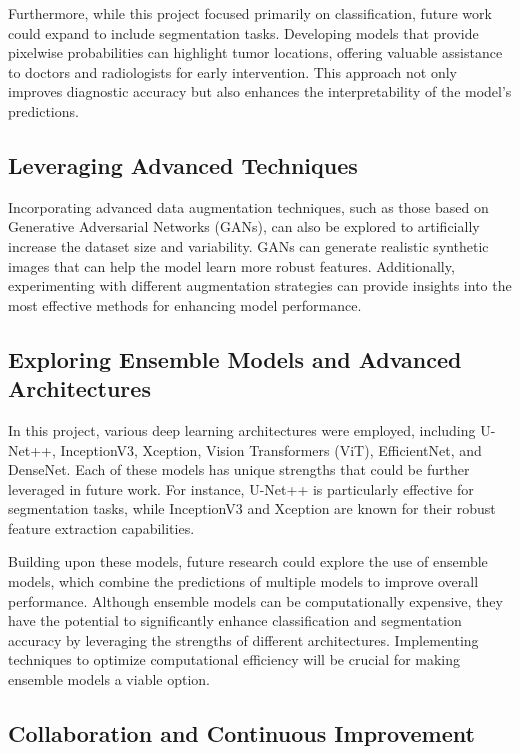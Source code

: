 Furthermore, while this project focused primarily on classification, future work could expand to include segmentation tasks. Developing models that provide pixelwise probabilities can highlight tumor locations, offering valuable assistance to doctors and radiologists for early intervention. This approach not only improves diagnostic accuracy but also enhances the interpretability of the model's predictions.

\subsection{Leveraging Advanced Techniques}

Incorporating advanced data augmentation techniques, such as those based on Generative Adversarial Networks (GANs), can also be explored to artificially increase the dataset size and variability. GANs can generate realistic synthetic images that can help the model learn more robust features. Additionally, experimenting with different augmentation strategies can provide insights into the most effective methods for enhancing model performance.

\subsection{Exploring Ensemble Models and Advanced Architectures}

In this project, various deep learning architectures were employed, including U-Net++, InceptionV3, Xception, Vision Transformers (ViT), EfficientNet, and DenseNet. Each of these models has unique strengths that could be further leveraged in future work. For instance, U-Net++ is particularly effective for segmentation tasks, while InceptionV3 and Xception are known for their robust feature extraction capabilities.

Building upon these models, future research could explore the use of ensemble models, which combine the predictions of multiple models to improve overall performance. Although ensemble models can be computationally expensive, they have the potential to significantly enhance classification and segmentation accuracy by leveraging the strengths of different architectures. Implementing techniques to optimize computational efficiency will be crucial for making ensemble models a viable option.

\subsection{Collaboration and Continuous Improvement}

